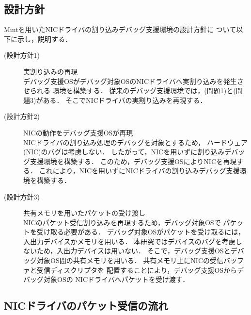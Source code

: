\documentclass[submit,techreq,noauthor,dvipdfmx]{ipsj}
\begin{document}
\subsection{設計方針}\label{sec:policy_of_design}

Mintを用いたNICドライバの割り込みデバッグ支援環境の設計方針に
ついて以下に示し，説明する．

\begin{description}
    \item[(設計方針1)] 実割り込みの再現\\
        デバッグ支援OSがデバッグ対象OSのNICドライバへ実割り込みを発生させられる
        環境を構築する．
        従来のデバッグ支援環境では，(問題1)と(問題3)がある．
        そこでNICドライバの実割り込みを再現する．
    \item[(設計方針2)] NICの動作をデバッグ支援OSが再現\\
        NICドライバの割り込み処理のデバッグを対象とするため，
        ハードウェア(NIC)のバグは考慮しない．
        したがって，NICを用いずに割り込みデバッグ支援環境を構築する．
        このため，デバッグ支援OSによりNICを再現する．
        これにより，NICを用いずにNICドライバの割り込みデバッグ支援環境を構築する．
    \item[(設計方針3)] 共有メモリを用いたパケットの受け渡し\\
        NICのパケット受信割り込みを再現するため，デバッグ対象OSで
        パケットを受け取る必要がある．
        デバッグ対象OSがパケットを受け取るには，
        入出力デバイスかメモリを用いる．
        本研究ではデバイスのバグを考慮しないため，入出力デバイスは用いない．
        そこで，デバッグ支援OSとデバッグ対象OS間の共有メモリを用いる．
        共有メモリ上にNICの受信バッファと受信ディスクリプタを
        配置することにより，デバッグ支援OSからデバッグ対象OSの
        NICドライバへパケットを受け渡す．
\end{description}

\subsection{NICドライバのパケット受信の流れ}\label{sec:flow_of_recieving_packet_in_NIC_driver}

\end{document}
